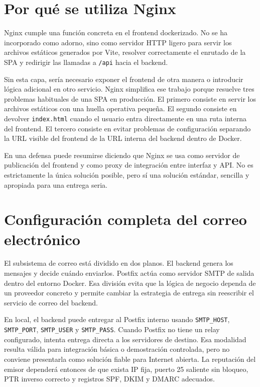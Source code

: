 \documentclass[11pt, a4paper]{article}
\begin{document}
\section{Por qué se utiliza Nginx}

Nginx cumple una función concreta en el frontend dockerizado. No se ha incorporado como adorno, sino como servidor HTTP ligero para servir los archivos estáticos generados por Vite, resolver correctamente el enrutado de la SPA y redirigir las llamadas a \texttt{/api} hacia el backend.

Sin esta capa, sería necesario exponer el frontend de otra manera o introducir lógica adicional en otro servicio. Nginx simplifica ese trabajo porque resuelve tres problemas habituales de una SPA en producción. El primero consiste en servir los archivos estáticos con una huella operativa pequeña. El segundo consiste en devolver \texttt{index.html} cuando el usuario entra directamente en una ruta interna del frontend. El tercero consiste en evitar problemas de configuración separando la URL visible del frontend de la URL interna del backend dentro de Docker.

En una defensa puede resumirse diciendo que Nginx se usa como servidor de publicación del frontend y como proxy de integración entre interfaz y API. No es estrictamente la única solución posible, pero sí una solución estándar, sencilla y apropiada para una entrega seria.

\section{Configuración completa del correo electrónico}

El subsistema de correo está dividido en dos planos. El backend genera los mensajes y decide cuándo enviarlos. Postfix actúa como servidor SMTP de salida dentro del entorno Docker. Esa división evita que la lógica de negocio dependa de un proveedor concreto y permite cambiar la estrategia de entrega sin reescribir el servicio de correo del backend.

En local, el backend puede entregar al Postfix interno usando \texttt{SMTP\_HOST}, \texttt{SMTP\_PORT}, \texttt{SMTP\_USER} y \texttt{SMTP\_PASS}. Cuando Postfix no tiene un relay configurado, intenta entrega directa a los servidores de destino. Esa modalidad resulta válida para integración básica o demostración controlada, pero no conviene presentarla como solución fiable para Internet abierta. La reputación del emisor dependerá entonces de que exista IP fija, puerto 25 saliente sin bloqueo, PTR inverso correcto y registros SPF, DKIM y DMARC adecuados.
\end{document}
